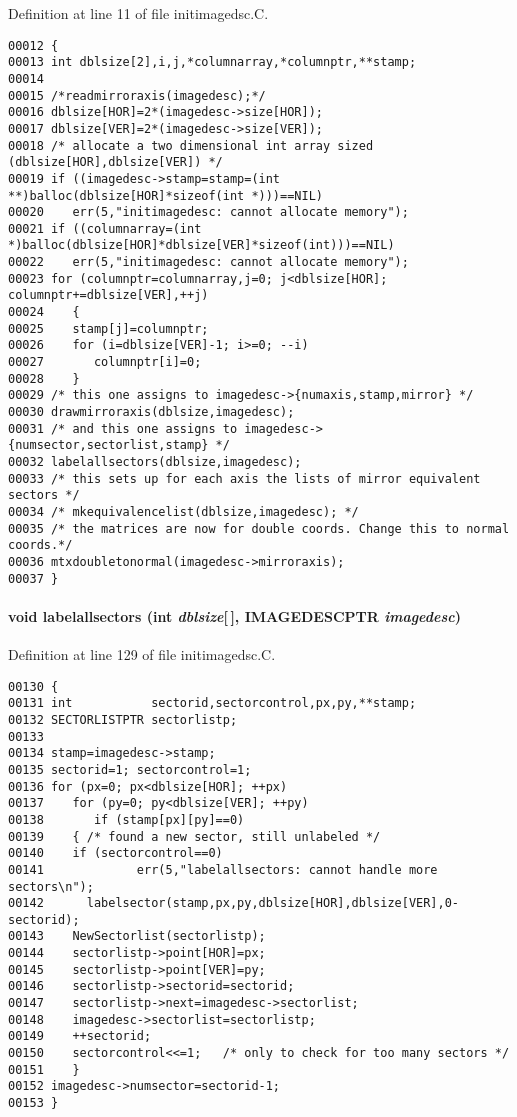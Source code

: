 Definition at line 11 of file initimagedsc.C.\small\begin{verbatim}00012 {
00013 int dblsize[2],i,j,*columnarray,*columnptr,**stamp;
00014 
00015 /*readmirroraxis(imagedesc);*/
00016 dblsize[HOR]=2*(imagedesc->size[HOR]);
00017 dblsize[VER]=2*(imagedesc->size[VER]);
00018 /* allocate a two dimensional int array sized (dblsize[HOR],dblsize[VER]) */
00019 if ((imagedesc->stamp=stamp=(int **)balloc(dblsize[HOR]*sizeof(int *)))==NIL)
00020    err(5,"initimagedesc: cannot allocate memory");
00021 if ((columnarray=(int *)balloc(dblsize[HOR]*dblsize[VER]*sizeof(int)))==NIL)
00022    err(5,"initimagedesc: cannot allocate memory");
00023 for (columnptr=columnarray,j=0; j<dblsize[HOR]; columnptr+=dblsize[VER],++j)
00024    {
00025    stamp[j]=columnptr;
00026    for (i=dblsize[VER]-1; i>=0; --i)
00027       columnptr[i]=0;
00028    }
00029 /* this one assigns to imagedesc->{numaxis,stamp,mirror} */
00030 drawmirroraxis(dblsize,imagedesc);
00031 /* and this one assigns to imagedesc->{numsector,sectorlist,stamp} */
00032 labelallsectors(dblsize,imagedesc);
00033 /* this sets up for each axis the lists of mirror equivalent sectors */
00034 /* mkequivalencelist(dblsize,imagedesc); */
00035 /* the matrices are now for double coords. Change this to normal coords.*/
00036 mtxdoubletonormal(imagedesc->mirroraxis);
00037 }
\end{verbatim}\normalsize 
\label{im.h_a12}
\paragraph{\setlength{\rightskip}{0pt plus 5cm}void labelallsectors (int {\em dblsize}[$\,$], {\bf IMAGEDESCPTR} {\em imagedesc})}\hfill



Definition at line 129 of file initimagedsc.C.\small\begin{verbatim}00130 {
00131 int           sectorid,sectorcontrol,px,py,**stamp;
00132 SECTORLISTPTR sectorlistp;
00133 
00134 stamp=imagedesc->stamp;
00135 sectorid=1; sectorcontrol=1;
00136 for (px=0; px<dblsize[HOR]; ++px)
00137    for (py=0; py<dblsize[VER]; ++py)
00138       if (stamp[px][py]==0)
00139    { /* found a new sector, still unlabeled */
00140    if (sectorcontrol==0)
00141             err(5,"labelallsectors: cannot handle more sectors\n");
00142      labelsector(stamp,px,py,dblsize[HOR],dblsize[VER],0-sectorid);
00143    NewSectorlist(sectorlistp);
00144    sectorlistp->point[HOR]=px;
00145    sectorlistp->point[VER]=py;
00146    sectorlistp->sectorid=sectorid;
00147    sectorlistp->next=imagedesc->sectorlist;
00148    imagedesc->sectorlist=sectorlistp;
00149    ++sectorid;
00150    sectorcontrol<<=1;   /* only to check for too many sectors */
00151    }
00152 imagedesc->numsector=sectorid-1;
00153 }
\end{verbatim}\normalsize 
\label{im.h_a14}

